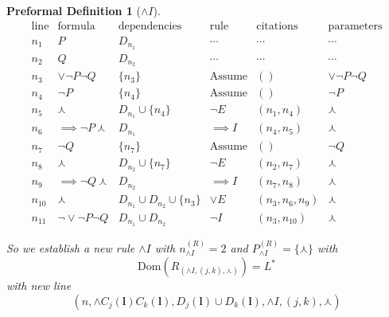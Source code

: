 \documentclass[oneside, 12pt]{book}
\theoremstyle{break}
\newtheorem{preformal definition}[definition]{Preformal Definition}
\newtheorem{preformal theorem}[theorem]{Preformal Theorem}
\newcommand{\bv}[1]{\boldsymbol{#1}}
\begin{document}
		\begin{preformal definition}[$\land I$]
			\begin{equation*}
				\begin{array}{c|c|c|c|c|c}
					\text{line} & \text{formula} & \text{dependencies} & \text{rule} & \text{citations} & \text{parameters}\\ \hline		
					n_1 & P & D_{n_1} & \cdots & \cdots & \cdots\\
					n_2 & Q & D_{n_2} & \cdots & \cdots & \cdots\\
					n_3 & \lor \lnot P \lnot Q & \{n_3\} & \text{Assume} & () & \lor \lnot P \lnot Q\\
					n_4 & \lnot P & \{n_4\} & \text{Assume} & () & \lnot P\\
					n_5 & \curlywedge & D_{n_1} \cup \{n_4\} & \lnot E & (n_1, n_4) & \curlywedge\\
					n_6 & \implies \lnot P \curlywedge &  D_{n_1} & \implies I & (n_4, n_5) & \curlywedge\\
					n_7 & \lnot Q & \{n_7\} & \text{Assume} & () & \lnot Q\\
					n_8 & \curlywedge & D_{n_2} \cup \{n_7\} & \lnot E & (n_2, n_7) & \curlywedge\\
					n_9 & \implies \lnot Q \curlywedge & D_{n_2} & \implies I & (n_7, n_8) & \curlywedge\\
					n_{10} & \curlywedge & D_{n_1} \cup D_{n_2} \cup \{n_3\} & \lor E & (n_3, n_6, n_9) & \curlywedge\\
					n_{11} & \lnot \lor \lnot P \lnot Q & D_{n_1} \cup D_{n_2} & \lnot I & (n_3, n_{10}) & \curlywedge
				\end{array}
			\end{equation*}				
			
			So we establish a new rule $\land I$ with $n_{\land I}^{(R)} = 2$ and $P_{\land I}^{(R)} = \{\curlywedge\}$ with
			\begin{equation*}
				\text{Dom}(R_{(\land I, (j, k), \curlywedge)}) = L^*
			\end{equation*}
			with new line
			\begin{equation*}
				(n, \land C_j(\bv{l})C_k(\bv{l}), D_j(\bv{l}) \cup D_k(\bv{l}), \land I, (j, k), \curlywedge)
			\end{equation*}
		\end{preformal definition}
			
\end{document}
